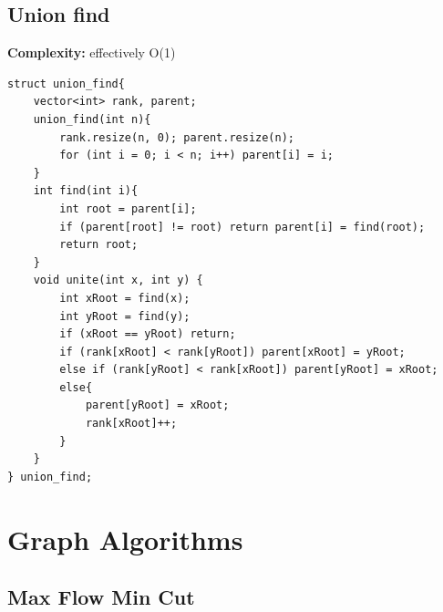 \documentclass[10pt,a4paper]{article}
\begin{document}
\subsection{Union find}

\textbf{Complexity:} effectively O(1)
\begin{verbatim}
struct union_find{
    vector<int> rank, parent;
    union_find(int n){
        rank.resize(n, 0); parent.resize(n);
        for (int i = 0; i < n; i++) parent[i] = i;
    }
    int find(int i){
        int root = parent[i];
        if (parent[root] != root) return parent[i] = find(root);
        return root;
    }
    void unite(int x, int y) {
        int xRoot = find(x);
        int yRoot = find(y);
        if (xRoot == yRoot) return;
        if (rank[xRoot] < rank[yRoot]) parent[xRoot] = yRoot;
        else if (rank[yRoot] < rank[xRoot]) parent[yRoot] = xRoot;
        else{
            parent[yRoot] = xRoot;
            rank[xRoot]++;
        }
    }
} union_find;
\end{verbatim}

\section{Graph Algorithms}

\subsection{Max Flow Min Cut}
\end{document}
